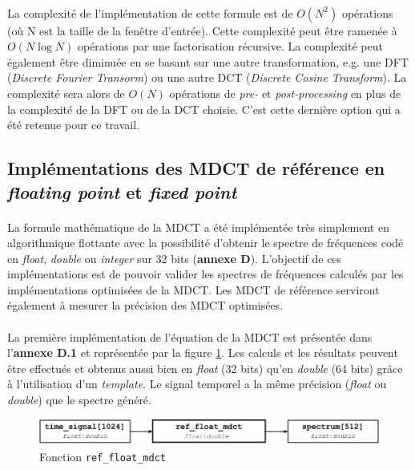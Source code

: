 \documentclass{article}
\begin{document}
    \paragraph{}
    La complexité de l'implémentation de cette formule est de $O(N^2)$ opérations (où N est la taille de la fenêtre d'entrée). Cette complexité peut être ramenée à $O(N \log N)$ opérations par une factorisation récursive. La complexité peut également être diminuée en se basant sur une autre transformation, e.g. une DFT (\emph{Discrete Fourier Transorm}) ou une autre DCT (\emph{Discrete Cosine Transform}). La complexité sera alors de $O(N)$ opérations de \emph{pre-} et \emph{post-processing} en plus de la complexité de la DFT ou de la DCT choisie\cite{wiki:MDCT}. C'est cette dernière option qui a été retenue pour ce travail.


    \subsection{Implémentations des MDCT de référence en \emph{floating point} et \emph{fixed point}}

    \paragraph{}
    La formule mathématique de la MDCT a été implémentée très simplement en algorithmique flottante avec la possibilité d'obtenir le spectre de fréquences codé en \emph{float}, \emph{double} ou \emph{integer} sur 32 bits (\textbf{annexe D}). L'objectif de ces implémentations est de pouvoir valider les spectres de fréquences calculés par les implémentations optimisées de la MDCT. Les MDCT de référence serviront également à mesurer la précision des MDCT optimisées.

    \paragraph{}
    La première implémentation de l'équation de la MDCT est présentée dans l'\textbf{annexe D.1} et représentée par la figure \ref{fig:func_ref_float_mdct}. Les calculs et les résultats peuvent être effectués et obtenus aussi bien en \emph{float} (32 bits) qu'en \emph{double} (64 bits) grâce à l'utilisation d'un \emph{template}. Le signal temporel a la même précision (\emph{float} ou \emph{double}) que le spectre généré.
    \begin{figure}[H]
        \centering
        \includegraphics[width=.8\linewidth]{./images/func_ref_float_mdct.pdf}
        \caption{Fonction \texttt{ref\_float\_mdct}}
        \label{fig:func_ref_float_mdct}
    \end{figure}
\end{document}
